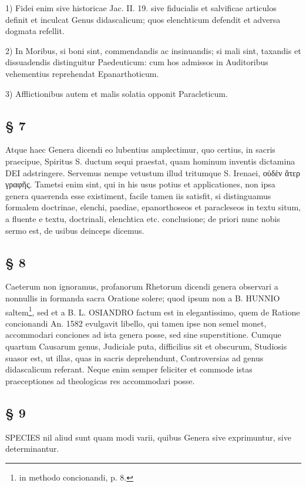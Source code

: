 1) Fidei enim sive historicae Jac. II. 19. sive fiducialis et salvificae articulos definit et inculcat Genus didascalicum; quos elenchticum defendit et adversa dogmata refellit.

2) In Moribus, si boni sint, commendandis ac insinuandis; si mali sint, taxandis et dissuadendis distinguitur Paedeuticum: cum hos admissos in Auditoribus vehementius reprehendat Epanarthoticum.

3) Afflictionibus autem et malis solatia opponit Paracleticum.

\subsection{§ 7}

Atque haec Genera dicendi eo lubentius amplectimur, quo certius, in sacris praecipue, Spiritus S. ductum sequi praestat, quam hominum inventis dictamina DEI adstringere. Servemus nempe vetustum illud tritumque S. Irenaei, οὐδὲν ἄτερ γραφῆς. Tametsi enim sint, qui in his usus potius et applicationes, non ipsa genera quaerenda esse existiment, facile tamen iis satisfit, si distinguamus formalem doctrinae, elenchi, paediae, epanorthoseos et paracleseos in textu situm, a fluente e textu, doctrinali, elenchtica etc. conclusione; de priori nunc nobis sermo est, de usibus deinceps dicemus.

\subsection{§ 8}

Caeterum non ignoramus, profanorum Rhetorum dicendi genera observari a nonnullis in formanda sacra Oratione solere; quod ipsum non a B. HUNNIO saltem\footnote{in methodo concionandi, p. 8.}, sed et a B. L. OSIANDRO factum est in elegantissimo, quem de Ratione concionandi An. 1582 evulgavit libello, qui tamen ipse non semel monet, accommodari conciones ad ista genera posse, sed sine superstitione. Cumque quartum Causarum genus, Judiciale puta, difficilius sit et obscurum, Studiosis suasor est, ut illas, quas in sacris deprehendunt, Controversias ad genus didascalicum referant. Neque enim semper feliciter et commode istas praeceptiones ad theologicas res accommodari posse.

\subsection{§ 9}

SPECIES nil aliud sunt quam modi varii, quibus Genera sive exprimuntur, sive determinantur.

